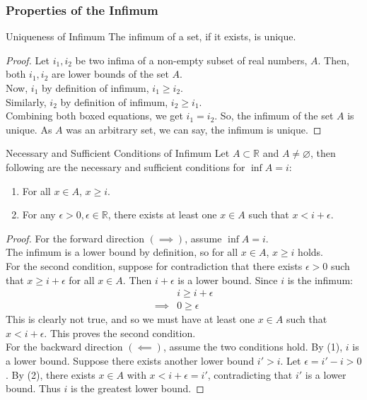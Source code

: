 \subsubsection{Properties of the Infimum}
\begin{Theorem}{Uniqueness of Infimum}\label{uniqueness_infimum}
    The infimum of a set, if it exists, is unique.
\end{Theorem}
\begin{proof}
    Let $i_1, i_2$ be two infima of a non-empty subset of real numbers, $A$. Then, both $i_1, i_2$ are lower bounds of the set $A$.\\ 
    Now, $i_1$ by definition of infimum, $\boxed{i_1 \geq i_2}$.\\
    Similarly, $i_2$ by definition of infimum, $\boxed{i_2 \geq i_1}$. \\
    Combining both boxed equations, we get $i_1 = i_2$. So, the infimum of the set $A$ is unique. As $A$ was an arbitrary set, we can say, the infimum is unique.
\end{proof}

\begin{Theorem}{Necessary and Sufficient Conditions of Infimum}\label{iff_infimum}
    Let $A\subset\mathbb{R}$ and $A\neq\varnothing$, then following are the necessary and sufficient conditions for $\inf A = i$:
    \begin{enumerate}
        \item For all $x\in A$, $x \geq i$.
        \item For any $\epsilon > 0, \epsilon\in\mathbb{R}$, there exists at least one $x\in A$ such that $x < i + \epsilon$.
    \end{enumerate}
\end{Theorem}
\begin{proof}
    For the forward direction $(\implies)$, assume $\inf A = i$. \\
    The infimum is a lower bound by definition, so for all $x\in A$, $x \geq i$ holds. \\
    For the second condition, suppose for contradiction that there exists $\epsilon > 0$ such that $x \geq i + \epsilon$ for all $x \in A$. Then $i + \epsilon$ is a lower bound. Since $i$ is the infimum:
    \begin{align*}
        & i \geq i + \epsilon \\
        \implies & 0 \geq \epsilon
    \end{align*}
    This is clearly not true, and so we must have at least one $x\in A$ such that $x < i + \epsilon$. This proves the second condition. \\
    For the backward direction $(\impliedby)$, assume the two conditions hold. By (1), $i$ is a lower bound. Suppose there exists another lower bound $i' > i$. Let $\epsilon = i' - i > 0$. By (2), there exists $x \in A$ with $x < i + \epsilon = i'$, contradicting that $i'$ is a lower bound. Thus $i$ is the greatest lower bound.
\end{proof}

